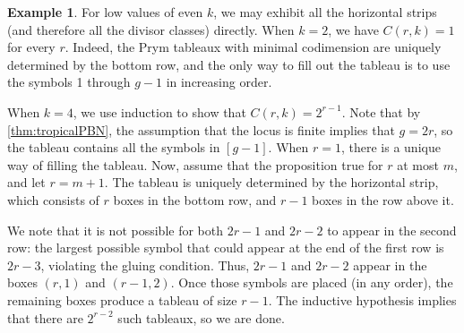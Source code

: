 \documentclass[11pt,reqno]{amsart}
\newcommand{\yoav}[1]{{\color{blue} \sf  Yo$\alpha$v: [#1]}}
\theoremstyle{definition}
\theoremstyle{problem}
\newtheorem{example}[definition]{Example}
\theoremstyle{plain}
\newtheorem{proposition}[definition]{Proposition}
\theoremstyle{remark}
\theoremstyle{theorem}
\numberwithin{equation}{section}
\numberwithin{figure}{section}
\theoremstyle{definition}
\theoremstyle{problem}
\newtheorem{example}[definition]{Example}
\theoremstyle{plain}
\begin{document}
\begin{example}
 	For low values of even $k$,  we may exhibit all the horizontal strips (and therefore all the divisor classes) directly. When $k=2$, we have $C(r,k)=1$ for every $r$. Indeed, the Prym tableaux with minimal codimension are uniquely determined by the bottom row, and the only way to fill out the tableau is to use the symbols 1 through $g-1$ in increasing order.
 	
 	 When $k=4$, we use induction to show that $C(r,k)=2^{r-1}$. 
 	 Note that by \cref{thm:tropicalPBN}, the assumption that the locus is finite implies that $g=2r$, so the tableau contains all the symbols in $[g-1]$. 
 	  	 When $r=1$, there is a unique way of filling the tableau. 
 	  	 Now, assume that the proposition true for $r$ at most $m$, and let $r=m+1$. The tableau is uniquely determined by the horizontal strip, which consists of  $r$ boxes in the
 	 bottom row, and $r-1$ boxes in the  row above it. 
 	 
 	 We note that it is not possible for both $2r-1$ and $2r-2$ to appear in the second row: the largest possible symbol that could appear at the end of the first row is $2r-3$, violating the gluing condition. Thus, $2r-1$ and $2r-2$ appear in the boxes $(r,1)$ and $(r-1,2)$. Once those symbols are placed (in any order), 
 	 the remaining boxes produce a tableau of size $r-1$. The  inductive hypothesis implies that there are $2^{r-2}$ such tableaux, so we are done.
 	 	 
 	
\end{example}
%
%
\end{document}
